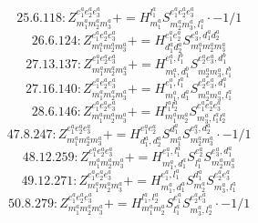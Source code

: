 \documentclass[letterpaper,10pt,fleqn,leqno,onecolumn]{article}
\begin{document}
\begin{equation} \;\;\;\;\;\;  25.6.118: Z^{e_{1}^{a}e_{2}^{a}e_{3}^{a}}_{m_{1}^{a}m_{2}^{a}m_{3}^{a}}+=H^{l_{1}^{a}}_{m_{1}^{a}}S^{e_{1}^{a}e_{2}^{a}e_{3}^{a}}_{m_{2}^{a}m_{3}^{a},l_{1}^{a}}\cdot -1/1 \end{equation}
\begin{equation} \;\;\;\;\;\;  26.6.124: Z^{e_{1}^{a}e_{2}^{a}e_{3}^{a}}_{m_{1}^{a}m_{2}^{a}m_{3}^{a}}+=H^{e_{1}^{a}e_{2}^{a}}_{d_{1}^{a}d_{2}^{a}}S^{e_{3}^{a},d_{1}^{a}d_{2}^{a}}_{m_{1}^{a}m_{2}^{a}m_{3}^{a}} \end{equation}
\begin{equation} \;\;\;\;\;\;  27.13.137: Z^{e_{1}^{a}e_{2}^{a}e_{3}^{a}}_{m_{1}^{a}m_{2}^{a}m_{3}^{a}}+=H^{e_{1}^{a},l_{1}^{b}}_{m_{1}^{a},d_{1}^{b}}S^{e_{2}^{a}e_{3}^{a},d_{1}^{b}}_{m_{2}^{a}m_{3}^{a},l_{1}^{b}} \end{equation}
\begin{equation} \;\;\;\;\;\;  27.16.140: Z^{e_{1}^{a}e_{2}^{a}e_{3}^{a}}_{m_{1}^{a}m_{2}^{a}m_{3}^{a}}+=H^{e_{1}^{a},l_{1}^{a}}_{m_{1}^{a},d_{1}^{a}}S^{e_{2}^{a}e_{3}^{a},d_{1}^{a}}_{m_{2}^{a}m_{3}^{a},l_{1}^{a}} \end{equation}
\begin{equation} \;\;\;\;\;\;  28.6.146: Z^{e_{1}^{a}e_{2}^{a}e_{3}^{a}}_{m_{1}^{a}m_{2}^{a}m_{3}^{a}}+=H^{l_{1}^{a}l_{2}^{a}}_{m_{1}^{a}m_{2}^{a}}S^{e_{1}^{a}e_{2}^{a}e_{3}^{a}}_{m_{3}^{a},l_{1}^{a}l_{2}^{a}} \end{equation}
\begin{equation} \;\;\;\;\;\;  47.8.247: Z^{e_{1}^{a}e_{2}^{a}e_{3}^{a}}_{m_{1}^{a}m_{2}^{a}m_{3}^{a}}+=H^{e_{1}^{a}e_{2}^{a}}_{d_{1}^{a},d_{2}^{a}}S^{d_{1}^{a}}_{m_{1}^{a}}S^{e_{3}^{a},d_{2}^{a}}_{m_{2}^{a}m_{3}^{a}}\cdot -1/1 \end{equation}
\begin{equation} \;\;\;\;\;\;  48.12.259: Z^{e_{1}^{a}e_{2}^{a}e_{3}^{a}}_{m_{1}^{a}m_{2}^{a}m_{3}^{a}}+=H^{e_{1}^{a},l_{1}^{a}}_{m_{1}^{a},d_{1}^{a}}S^{e_{2}^{a}}_{l_{1}^{a}}S^{e_{3}^{a},d_{1}^{a}}_{m_{2}^{a}m_{3}^{a}} \end{equation}
\begin{equation} \;\;\;\;\;\;  49.12.271: Z^{e_{1}^{a}e_{2}^{a}e_{3}^{a}}_{m_{1}^{a}m_{2}^{a}m_{3}^{a}}+=H^{e_{1}^{a},l_{1}^{a}}_{m_{1}^{a},d_{1}^{a}}S^{d_{1}^{a}}_{m_{2}^{a}}S^{e_{2}^{a}e_{3}^{a}}_{m_{3}^{a},l_{1}^{a}} \end{equation}
\begin{equation} \;\;\;\;\;\;  50.8.279: Z^{e_{1}^{a}e_{2}^{a}e_{3}^{a}}_{m_{1}^{a}m_{2}^{a}m_{3}^{a}}+=H^{l_{1}^{a},l_{2}^{a}}_{m_{1}^{a}m_{2}^{a}}S^{e_{1}^{a}}_{l_{1}^{a}}S^{e_{2}^{a}e_{3}^{a}}_{m_{3}^{a},l_{2}^{a}}\cdot -1/1 \end{equation}
\end{document}
